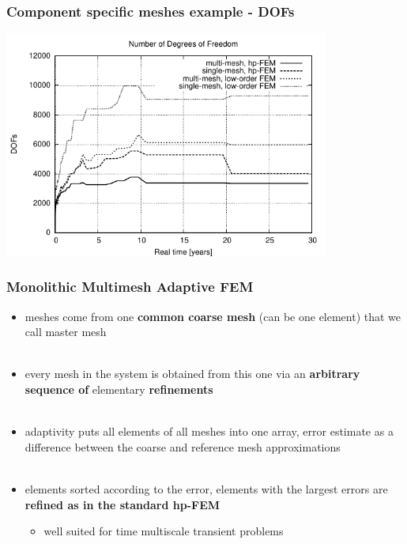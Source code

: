 \documentclass{beamer}
\begin{document}
\begin{frame}
\frametitle{Component specific meshes example - DOFs}
\begin{center}
\includegraphics[width=0.8\textwidth]{reactordofscompare.pdf}
\end{center}
\end{frame}

\begin{frame}
\frametitle{Monolithic Multimesh Adaptive FEM}
\begin{itemize}
\item meshes come from one \textbf{common coarse mesh} (can be one element) that we call master mesh\\\ \\
\item every mesh in the system is obtained from this one via an \textbf{arbitrary sequence of} elementary \textbf{refinements}\\\ \\
\item adaptivity puts all elements of all meshes into one array, error estimate as a difference between the coarse and reference mesh approximations\\ \ \\
\item elements sorted according to the error, elements with the largest errors are \textbf{refined as in the standard hp-FEM}
\begin{itemize}
\item well suited for time multiscale transient problems
\end{itemize}
\end{itemize}
\end{frame}

\end{document}
